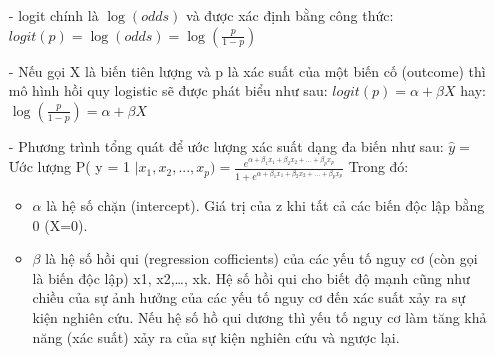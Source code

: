 \documentclass{report}
\newcommand\tab[1][1.25cm]{\hspace*{#1}}
\begin{document}
\begin{enumerate}
\begin{enumerate}
        \item [- ] logit chính là $\log(odds)$ và được xác định bằng công thức: \\\tab\textbf{$logit(p) = \log(odds) = \log(\frac{p}{1 - p})$}
        \item [- ] Nếu gọi X là biến tiên lượng và p là xác suất của một biến cố (outcome) thì mô hình hồi quy logistic sẽ được phát biểu như sau:
        \vspace{0.2cm}\newline\tab[6cm] $logit(p) = \alpha + \beta X$ \newline\tab[5cm] hay: \vspace{0.2cm}\newline\tab[6cm] $\log(\frac{p}{1 - p}) = \alpha + \beta X$
        \item [- ] Phương trình tổng quát để ước lượng xác suất dạng đa biến như sau:
        \vspace{0.2cm}\newline\tab[2cm] $\hat{y} = $ Ước lượng P( y = 1 $\mid x_1, x_2,...,x_p) = \frac{e^{\alpha + \beta_1x_1 + \beta_2x_2 + ... + \beta_px_p}}{1 + e^{\alpha + \beta_1x_1 + \beta_2x_2 + ... + \beta_px_p}}$
        Trong đó:
        \begin{itemize}
            \item $\alpha$ là hệ số chặn (intercept). Giá trị của z khi tất cả các biến độc lập bằng 0 (X=0).
            \item $\beta$ là hệ số hồi qui (regression cofficients) của các  yếu tố nguy cơ (còn gọi là biến độc lập) x1, x2,…, xk. Hệ số hồi qui cho biết độ mạnh cũng như chiều của sự ảnh hưởng của các yếu tố nguy cơ đến xác suất xảy ra sự kiện nghiên cứu. Nếu hệ số hồ qui dương thì yếu tố nguy cơ làm tăng khả năng (xác suất) xảy ra của sự kiện nghiên cứu và ngược lại.
        \end{itemize}
    \end{enumerate}
\end{enumerate}
    
\end{document}
